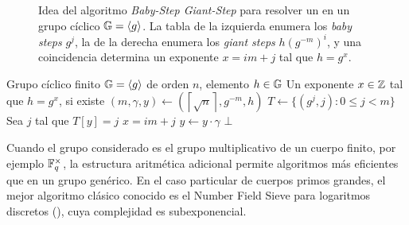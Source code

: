 \begin{figure}[!t]
	\centering
	\caption{Idea del algoritmo \textit{Baby-Step Giant-Step} para resolver un \DLP en un grupo cíclico $\mathbb{G}=\left\langle g \right\rangle$. La tabla de la izquierda enumera los \textit{baby steps} $g^j$, la de la derecha enumera los \textit{giant steps} $h(g^{-m})^i$, y una coincidencia determina un exponente $x=im+j$ tal que $h=g^x$.}
	\label{fig:bsgs-intuition}
\end{figure}

\begin{algorithm}[h]
	\caption{Algoritmo Baby-Step Giant-Step para \DLP}
	\label{alg:bsgs-dlp}
	\begin{algorithmic}[1]
		\Require Grupo cíclico finito $\mathbb{G} = \left\langle g \right\rangle$ de orden $n$, elemento $h \in \mathbb{G}$
		\Ensure Un exponente $x \in \mathbb{Z}$ tal que $h = g^x$, si existe
		\State $(m, \gamma, y) \gets \left(\left\lceil \sqrt{n} \right\rceil, g^{-m}, h\right)$
		\State $T \gets \{(g^j, j): 0 \leq j < m\}$
				\State Sea $j$ tal que $T[y] = j$
				\State \Return $x = im + j$
			\EndIf
			\State $y \gets y \cdot \gamma$
		\EndFor
		\State \Return $\bot$
	\end{algorithmic}
\end{algorithm}

Cuando el grupo considerado es el grupo multiplicativo de un cuerpo finito, por ejemplo $\mathbb{F}_{q}^{\times}$, la estructura aritmética adicional permite algoritmos más eficientes que en un grupo genérico. En el caso particular de cuerpos primos grandes, el mejor algoritmo clásico conocido es el Number Field Sieve para logaritmos discretos (\NFSDL), cuya complejidad es subexponencial.

